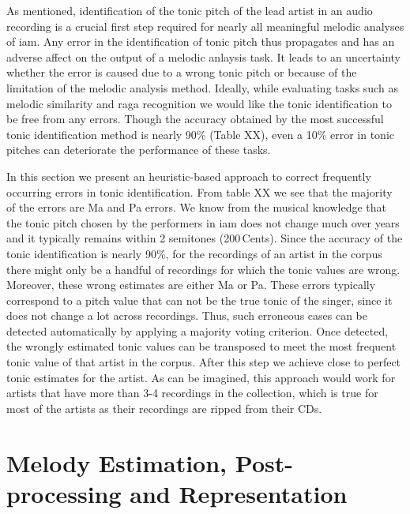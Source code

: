 {{As mentioned, identification of the tonic pitch of the lead artist in an audio recording is a crucial first step required for nearly all meaningful melodic analyses of \gls{iam}. Any error in the identification of tonic pitch thus propagates and has an adverse affect on the output of a melodic anlaysis task. It leads to an uncertainty whether the error is caused due to a wrong tonic pitch or because of the limitation of the melodic analysis method. Ideally, while evaluating tasks such as melodic similarity and \gls{raga} recognition we would like the tonic identification to be free from any errors. Though the accuracy obtained by the most successful tonic identification method is nearly 90\% (Table XX), even a 10\% error in tonic pitches can deteriorate the performance of these tasks. 

In this section we present an heuristic-based approach to correct frequently occurring errors in tonic identification. From table XX we see that the majority of the errors are Ma and Pa errors. We know from the musical knowledge that the tonic pitch chosen  by the performers in \gls{iam} does not change much over years and it typically remains within 2 semitones (200\,Cents). Since the accuracy of the tonic identification is nearly 90\%, for the recordings of an artist in the corpus there might only be a handful of recordings for which the tonic values are wrong. Moreover, these wrong estimates are either Ma or Pa. These errors typically correspond to a pitch value that can not be the true tonic of the singer, since it does not change a lot across recordings. Thus, such erroneous cases can be detected automatically by applying a majority voting criterion. Once detected, the wrongly estimated tonic values can be transposed to meet the most frequent tonic value of that artist in the corpus. After this step we achieve close to perfect tonic estimates for the artist. As can be imagined, this approach would work for artists that have more than 3-4 recordings in the collection, which is true for most of the artists as their recordings are ripped from their CDs.


\section{Melody Estimation, Post-processing and Representation}
\label{sec:data_preprocessing_melody_estimation}

}}
